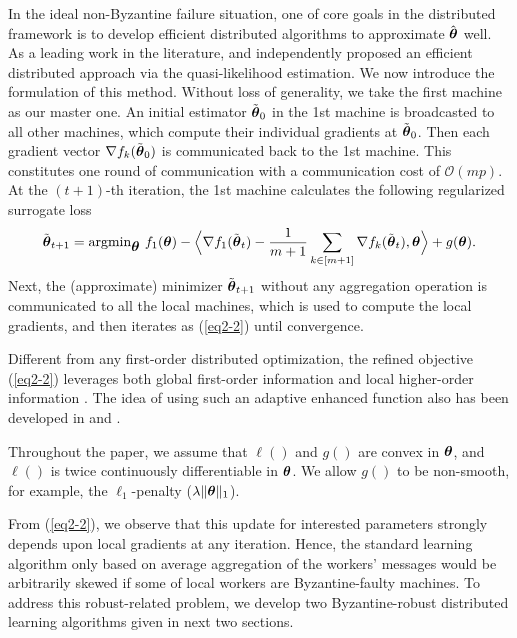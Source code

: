 \documentclass[12pt,a4paper]{article}%
\newcommand{\be}{\begin{equation}}
\newcommand{\ee}{\end{equation}}
\newcommand \vc[1]{{\mbox{\boldmath${#1}$}}}
\newcommand \vtheta{\vc \theta}
\numberwithin{equation}{section}
\begin{document}
In the ideal non-Byzantine failure situation, one of core goals in the distributed framework is to develop   efficient distributed algorithms to approximate $\hat{\vtheta}$ well.  As a leading work in the literature,
\cite{JordanLeeYang2019} and \cite{WangKolarSZ2017} independently proposed an efficient distributed approach via the quasi-likelihood estimation. We now introduce the formulation of this method. Without loss of generality, we take the first machine as our master one. An initial estimator $\tilde{\vtheta}_0$ in the 1st machine is broadcasted to all other machines, which  compute their individual gradients at $\tilde{\vtheta}_0$. Then each gradient vector $\nabla f_k(\tilde{\vtheta}_0)$ is communicated back to the 1st machine. This constitutes one round of communication with a communication cost of $\mathcal{O}(mp)$. At the $(t+1)$-th iteration, the 1st machine calculates the following regularized surrogate loss
\be\label{eq2-2}
\tilde{\vtheta}_{t+1}=\mathrm{argmin}_\vtheta ~f_1(\vtheta)-\Big\langle \nabla f_1(\tilde{\vtheta}_{t})-\frac{1}{m+1}\sum_{k\in[m+1]}\nabla f_k(\tilde{\vtheta}_{t}),\vtheta\Big\rangle+g(\vtheta).
\ee
Next, the (approximate) minimizer $\tilde{\vtheta}_{t+1}$ without any aggregation operation is communicated to all the local machines, which is used to compute the local gradients, and then iterates as (\ref{eq2-2}) until convergence.

 Different from any first-order distributed optimization, the refined objective (\ref{eq2-2}) leverages both global first-order information and local higher-order information \citep{WangKolarSZ2017}. The idea of using such an adaptive enhanced function also has been developed in \cite{Shamiretal2014} and \cite{FanGuoWang2019}.

 Throughout the paper, we assume that $\ell()$ and $g()$ are convex in $\vtheta$, and $\ell()$ is twice continuously differentiable in $\vtheta$. We allow $g()$ to be non-smooth,
 for example, the $\ell_1$-penalty ($\lambda\|\vtheta\|_1$).

From (\ref{eq2-2}), we observe that this update for interested parameters strongly depends upon local gradients at any iteration. Hence,   the standard learning algorithm only based on average aggregation of the workers' messages would be arbitrarily skewed if some of local workers are Byzantine-faulty machines. To address this robust-related problem, we develop  two Byzantine-robust distributed learning algorithms given in next two sections.
\end{document}
